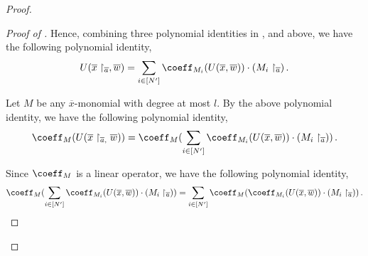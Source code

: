 \documentclass[11pt,letter]{article}
\theoremstyle{remark} %
\begin{document}
{\begin{proof}
\begin{proof}[Proof of ]
    Hence, combining three polynomial identities in ,  and  above, we have the following polynomial identity,
    \begin{equation}
        \label{equa: first combination}
        U(\overline{x}\restriction_{\overline{a}}, \overline{w}) = \sum_{i\in [N^\prime]} \coeff_{M_i}(U(\overline{x}, \overline{w})) \cdot (M_i\restriction_{\overline{a}}) \,.
    \end{equation}
        
    Let $M$ be any $\overline{x}$-monomial with degree at most $l$. By the above polynomial identity, we have the following polynomial identity,
    \begin{equation}
        \label{equa: by definition 2}
        \coeff_M( U(\overline{x}\restriction_{\overline{a},} \overline{w})) = \coeff_M(\sum_{i\in [N^\prime]} \coeff_{M_i}(U(\overline{x}, \overline{w})) \cdot (M_i\restriction_{\overline{a}}))\,.
    \end{equation}
    
    Since $\coeff_M$ is a linear operator, we have the following polynomial identity,
        \begin{equation}
            \label{equa: coefficient of an algebraic circuit is the same as the sum of all the coefficients of subcircuit}
            \coeff_M(\sum_{i\in [N^\prime]} \coeff_{M_i}(U(\overline{x}, \overline{w})) \cdot (M_i\restriction_{\overline{a}})) = \sum_{i\in [N^\prime]} \coeff_M(\coeff_{M_i}(U(\overline{x}, \overline{w})) \cdot (M_i\restriction_{\overline{a}})) \,.
        \end{equation}
        

\end{proof}
\end{proof}}
\end{document}
